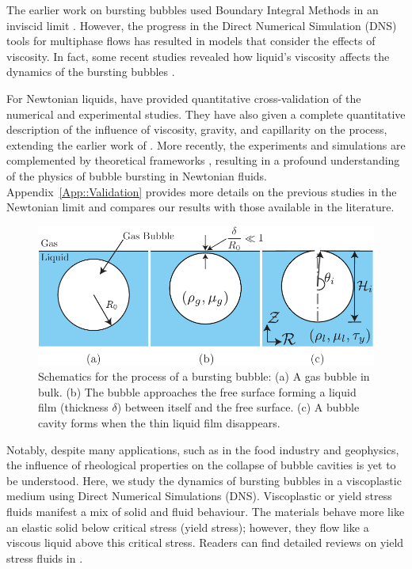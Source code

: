 \documentclass[final]{jfm}
\begin{document}
The earlier work on bursting bubbles used Boundary Integral Methods in an inviscid limit \citep{boulton1993gas,longuet1995critical}. However, the progress in the Direct Numerical Simulation (DNS) tools for multiphase flows \citep{tryggvason2011direct, popinet2003gerris, popinet2009accurate} has resulted in models that consider the effects of viscosity. In fact, some recent studies revealed how liquid's viscosity affects the dynamics of the bursting bubbles \citep{deike2018dynamics, gordillo2019capillary}.

For Newtonian liquids, \cite{deike2018dynamics} have provided quantitative cross-validation of the numerical and experimental studies. They have also given a complete quantitative description of the influence of viscosity, gravity, and capillarity on the process, extending the earlier work of \cite{duchemin2002jet}. More recently, the experiments and simulations are complemented by theoretical frameworks  \citep{gordillo2019capillary, ganan2017revision}, resulting in a profound understanding of the physics of bubble bursting in Newtonian fluids. Appendix~\ref{App::Validation} provides more details on the previous studies in the Newtonian limit and compares our results with those available in the literature.

 \begin{figure}
	\centerline{\includegraphics[width=0.67\linewidth]{Figure1_Schematic-eps-converted-to.pdf}}%
	\caption{Schematics for the process of a bursting bubble: (a) A gas bubble in bulk. (b) The bubble approaches the free surface forming a liquid film (thickness $\delta$) between itself and the free surface. (c) A bubble cavity forms when the thin liquid film disappears.}
	\label{fig:Schematic}
\end{figure}

Notably, despite many applications, such as in the food industry and geophysics, the influence of rheological properties on the collapse of bubble cavities is yet to be understood. Here, we study the dynamics of bursting bubbles in a viscoplastic medium using Direct Numerical Simulations (DNS). Viscoplastic or yield stress fluids manifest a mix of solid and fluid behaviour. The materials behave more like an elastic solid below critical stress (yield stress); however, they flow like a viscous liquid above this critical stress. Readers can find detailed reviews on yield stress fluids in \cite{bird1983rheology,coussot2014yield,balmforth2014yielding,bonn2017yield}.
\end{document}

